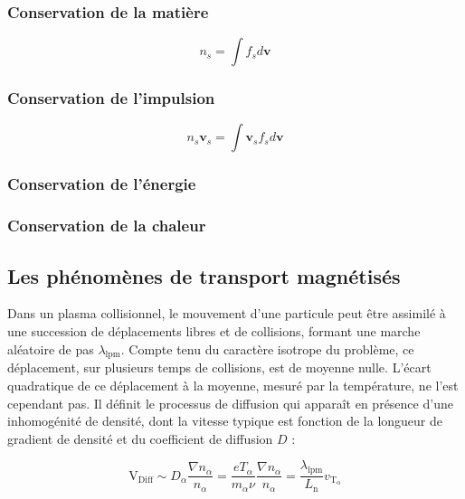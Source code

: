 \begin{refsection}
\subsubsection{Conservation de la matière}
$$n_s=\int f_sd\mathbf{v}$$

\subsubsection{Conservation de l'impulsion}
$$n_s\mathbf{v}_s=\int \mathbf{v}_sf_sd\mathbf{v}$$
\subsubsection{Conservation de l'énergie}
\subsubsection{Conservation de la chaleur}

\subsection{Les phénomènes de transport magnétisés}
Dans un plasma collisionnel, le mouvement d'une particule peut être assimilé à
une succession de déplacements libres et de collisions, formant une marche
aléatoire de pas $\lambda_\text{lpm}$. Compte tenu du caractère isotrope du
problème, ce déplacement, sur plusieurs temps de collisions, est de
moyenne nulle. L'écart quadratique de ce déplacement à la moyenne, mesuré par la
température, ne l'est cependant pas. Il définit le processus de diffusion qui
apparaît en présence d'une inhomogénité de densité, dont la vitesse typique est
fonction de la longueur de gradient de densité et du coefficient de diffusion
$D$ :
 
\begin{equation}
    \text{V}_\text{Diff}\sim D_\alpha\frac{\nabla
    n_\alpha}{n_\alpha}=\frac{eT_\alpha}{m_\alpha\nu}\frac{\nabla
    n_\alpha}{n_\alpha}=\frac{\lambda_\text{lpm}}{L_\text{n}}v_{\text{T}_\alpha}
\end{equation}
 

\end{refsection}
